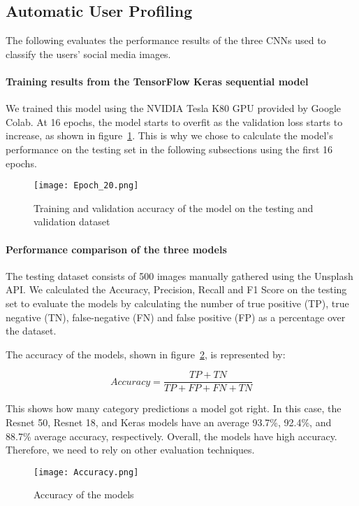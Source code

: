 \subsection{Automatic User Profiling} 

The following evaluates the performance results of the
three CNNs used to classify the users' social media images.

\paragraph{Training results from the TensorFlow Keras sequential model}

We trained this model using the NVIDIA Tesla K80 GPU provided by Google Colab. At 16 epochs,
the model starts to overfit as the validation loss starts to increase, as shown
in figure~\ref{kerasresults}. This is why we chose to calculate the model's performance on the
testing set in the following subsections using the first 16 epochs. 

\begin{figure}[h]
\centering
\texttt{[image: Epoch\_20.png]}
\caption{Training and validation accuracy of the model on the testing and validation dataset}
\label{kerasresults}
\end{figure}

\paragraph{Performance comparison of the three models}

The testing dataset consists of 500 images manually gathered using the Unsplash API. We
calculated the Accuracy, Precision, Recall and F1 Score on the testing set to
evaluate the models by calculating the number of true positive (TP), true
negative  (TN), false-negative (FN) and false positive (FP) as a
percentage over the dataset. 

The accuracy of the models, shown in figure~\ref{accuracy}, is represented by:

\[Accuracy = \frac{TP+TN}{TP+FP+FN+TN} \]

This shows how many category predictions a model got right. In this case, the Resnet 50,
Resnet 18, and Keras models have an average 93.7\%, 92.4\%, and 88.7\% average accuracy,
respectively. Overall, the models have high accuracy. Therefore, we need to rely on other
evaluation techniques.

\begin{figure}[h]
\centering
\texttt{[image: Accuracy.png]}
\caption{Accuracy of the models}
\label{accuracy}
\end{figure}

